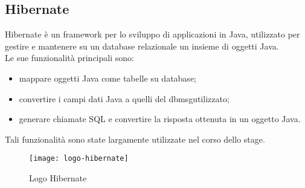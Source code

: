 \subsection{Hibernate}
Hibernate è un framework per lo sviluppo di applicazioni in Java, utilizzato per gestire e mantenere su un database relazionale un insieme di oggetti Java.
\\Le sue funzionalità principali sono:
\begin{itemize}
    \item mappare oggetti Java come tabelle su database;
    \item convertire i campi dati Java a quelli del \gls{dbmsg}\glsfirstoccur utilizzato;
    \item generare chiamate SQL e convertire la risposta ottenuta in un oggetto Java.
\end{itemize}
Tali funzionalità sono state largamente utilizzate nel corso dello stage.
\begin{figure}[h]
    \begin{center}
    \texttt{[image: logo-hibernate]}
    \caption{Logo Hibernate}
    \label{fig:figure5}
    \end{center}
\end{figure}

